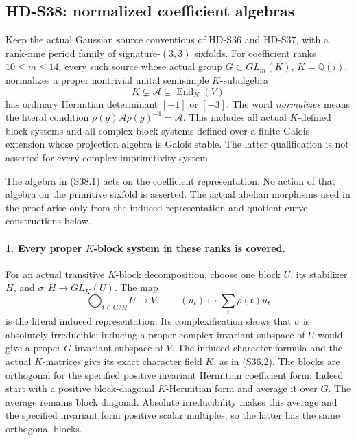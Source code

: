 \subsection{HD-S38: normalized coefficient algebras}
\label{sec:normalized-coefficient-algebras}

Keep the actual Gaussian source conventions of HD-S36 and HD-S37,
with a rank-nine period family of signature-\((3,3)\) sixfolds.
For coefficient ranks \(10\le m\le14\), every such source
whose actual group \(G\subset GL_m(K)\), \(K=\mathbb Q(i)\),
normalizes a proper nontrivial unital semisimple \(K\)-subalgebra
\[
           K\subsetneq\mathcal A\subsetneq\operatorname{End}_K(V)
                                                               \tag{S38.1}
\]
has ordinary Hermitian determinant \([-1]\) or \([-3]\).
The word \emph{normalizes} means the literal condition
\(\rho(g)\mathcal A\rho(g)^{-1}=\mathcal A\).
This includes all actual \(K\)-defined block systems and all
complex block systems defined over a finite Galois extension
whose projection algebra is Galois stable.
The latter qualification is not asserted for every complex
imprimitivity system.

The algebra in (S38.1) acts on the coefficient representation.
No action of that algebra on the primitive sixfold is asserted.
The actual abelian morphisms used in the proof arise only from
the induced-representation and quotient-curve constructions below.

\paragraph{1. Every proper \(K\)-block system in these ranks is covered.}
For an actual transitive \(K\)-block decomposition, choose one
block \(U\), its stabilizer \(H\), and
\(\sigma:H\to GL_K(U)\). The map
\[
  \bigoplus_{t\in G/H}U\longrightarrow V,
           \qquad (u_t)\longmapsto\sum_t\rho(t)u_t           \tag{S38.2}
\]
is the literal induced representation. Its complexification shows
that \(\sigma\) is absolutely irreducible: inducing a proper
complex invariant subspace of \(U\) would give a proper
\(G\)-invariant subspace of \(V\). The induced character
formula and the actual \(K\)-matrices give its exact character
field \(K\), as in (S36.2).
The blocks are orthogonal for the specified positive invariant
Hermitian coefficient form. Indeed start with a positive
block-diagonal \(K\)-Hermitian form and average it over \(G\).
The average remains block diagonal. Absolute irreducibility
makes this average and the specified invariant form positive
scalar multiples, so the latter has the same orthogonal blocks.

